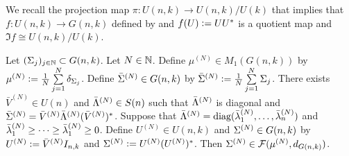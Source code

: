 \documentclass{book}
\begin{document}
	\begin{note}
		We recall the projection map $\pi: U(n,k) \rightarrow U(n,k) / U(k)$ that  implies that $f: U(n,k) \rightarrow G(n,k)$ defined by and $f(U) \vcentcolon= UU^*$ is a quotient map and $\Im f \cong U(n,k) / U(k)$.  
	\end{note}

	\begin{ex}
		Let $(\Sigma_j)_{j \in \mathbb{N}} \subset G(n,k)$. Let $N \in \mathbb{N}$. Define $\mu^{(N)} \in M_1(G(n,k))$ by $\mu^{(N)} \vcentcolon= \frac{1}{N} \sum\limits_{j =1}^N \delta_{\Sigma_j}$. Define $\bar{\Sigma}^{(N)} \in G(n,k)$ by $\bar{\Sigma}^{(N)} \vcentcolon= \frac{1}{N} \sum\limits_{j=1}^N \Sigma_j$. There exists $\bar{V}^{(N)} \in U(n)$ and $\bar{\Lambda}^{(N)} \in S(n)$ such that $\bar{\Lambda}^{(N)}$ is diagonal and $\bar{\Sigma}^{(N)} = \bar{V}^{(N)} \bar{\Lambda}^{(N)} (\bar{V}^{(N)})^*$. Suppose that $\bar{\Lambda}^{(N)} = \operatorname{\text{diag}}(\bar{\lambda}^{(N)}_1, \ldots, \bar{\lambda}^{(N)}_n)$ and $\bar{\lambda}^{(N)}_1 \geq \cdots \geq \bar{\lambda}^{(N)}_1 \geq 0$. Define $U^{(N)} \in U(n,k)$ and $\Sigma^{(N)} \in G(n,k)$ by $U^{(N)} \vcentcolon= \bar{V}^{(N)} I_{n,k}$ and $\Sigma^{(N)} \vcentcolon= U^{(N)}(U^{(N)})^*$. Then $\Sigma^{(N)} \in \mathcal{F}(\mu^{(N)}, d_{G(n, k)})$. 
	\end{ex}
\end{document}
